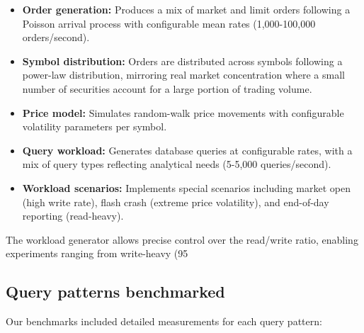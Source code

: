 \documentclass[11pt,a4paper]{article}
\begin{document}
\begin{itemize}
    \item \textbf{Order generation:} Produces a mix of market and limit orders following a Poisson arrival process with configurable mean rates (1,000-100,000 orders/second).
    
    \item \textbf{Symbol distribution:} Orders are distributed across symbols following a power-law distribution, mirroring real market concentration where a small number of securities account for a large portion of trading volume.
    
    \item \textbf{Price model:} Simulates random-walk price movements with configurable volatility parameters per symbol.
    
    \item \textbf{Query workload:} Generates database queries at configurable rates, with a mix of query types reflecting analytical needs (5-5,000 queries/second).
    
    \item \textbf{Workload scenarios:} Implements special scenarios including market open (high write rate), flash crash (extreme price volatility), and end-of-day reporting (read-heavy).
\end{itemize}

The workload generator allows precise control over the read/write ratio, enabling experiments ranging from write-heavy (95%

\subsection{Query patterns benchmarked}

Our benchmarks included detailed measurements for each query pattern:
\end{document}
